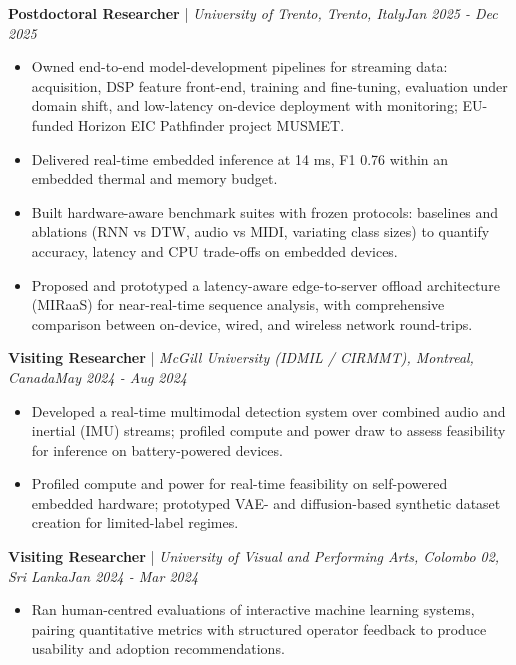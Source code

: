 \documentclass[11pt]{article}
\newenvironment{cvrole}[5]{%
  \par\noindent\textbf{\large #1} | \textit{\small #2, #3}\hfill \textit{\small #4 - #5}\par
  \begin{itemize}[leftmargin=2em, itemsep=-0.3em, topsep=-0.5em]%
}{%
  \end{itemize}\par\noindent\mbox{}\par\vspace{0.1em}%
}
\begin{document}
\begin{cvrole}{Postdoctoral Researcher}{University of Trento}{Trento, Italy}{Jan 2025}{Dec 2025}
    \item Owned end-to-end model-development pipelines for streaming data: acquisition, DSP feature front-end, training and fine-tuning, evaluation under domain shift, and low-latency on-device deployment with monitoring; EU-funded Horizon EIC Pathfinder project MUSMET.
    \item Delivered real-time embedded inference at 14 ms, F1 0.76 within an embedded thermal and memory budget.
    \item Built hardware-aware benchmark suites with frozen protocols: baselines and ablations (RNN vs DTW, audio vs MIDI, variating class sizes) to quantify accuracy, latency and CPU trade-offs on embedded devices.
    \item Proposed and prototyped a latency-aware edge-to-server offload architecture (MIRaaS) for near-real-time sequence analysis, with comprehensive comparison between on-device, wired, and wireless network round-trips.
\end{cvrole}

\begin{cvrole}{Visiting Researcher}{McGill University (IDMIL / CIRMMT)}{Montreal, Canada}{May 2024}{Aug 2024}
    \item Developed a real-time multimodal detection system over combined audio and inertial (IMU) streams; profiled compute and power draw to assess feasibility for inference on battery-powered devices.
    \item Profiled compute and power for real-time feasibility on self-powered embedded hardware; prototyped VAE- and diffusion-based synthetic dataset creation for limited-label regimes.
\end{cvrole}

\begin{cvrole}{Visiting Researcher}{University of Visual and Performing Arts}{Colombo 02, Sri Lanka}{Jan 2024}{Mar 2024}
    \item Ran human-centred evaluations of interactive machine learning systems, pairing quantitative metrics with structured operator feedback to produce usability and adoption recommendations.
\end{cvrole}
\end{document}
